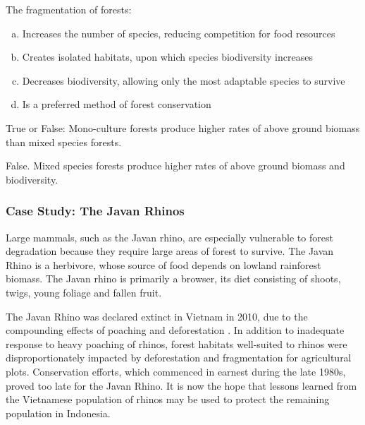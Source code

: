 \begin{problem}
The fragmentation of forests:
\begin{enumerate} [(a)]
\item Increases the number of species, reducing competition for food resources
\item Creates isolated habitats, upon which species biodiversity increases
\item Decreases biodiversity, allowing only the most adaptable species to survive
\item Is a preferred method of forest conservation
\end{enumerate}
\end{problem}

\begin{problem}
True or False: Mono-culture forests produce higher rates of above ground biomass than mixed species forests.

False. Mixed species forests produce higher rates of above ground biomass and biodiversity.
\end{problem}


\subsubsection{Case Study: The Javan Rhinos}

  Large mammals, such as the Javan rhino, are especially vulnerable to forest degradation because they require large areas of forest to survive. The Javan Rhino is a herbivore, whose source of food depends on lowland rainforest biomass. The Javan rhino is primarily a browser,  its diet consisting of shoots, twigs, young foliage and fallen fruit. 

 The Javan Rhino was declared extinct in Vietnam in 2010, due to the compounding effects of poaching and deforestation \citep{brook2014lessons}. In addition to inadequate response to heavy poaching of rhinos, forest habitats well-suited to rhinos were disproportionately impacted by deforestation and fragmentation for agricultural plots.  Conservation efforts, which commenced in earnest during the late 1980s, proved too late for the Javan Rhino.  It is now the hope that lessons learned from the Vietnamese population of rhinos may be used to protect the remaining population in Indonesia.
  
